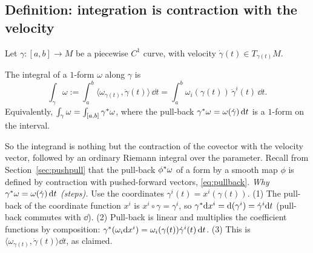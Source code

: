 \subsection{Definition: integration is contraction with the velocity}\label{sec:int1def}

Let $\gamma:[a,b]\to M$ be a piecewise $C^1$ curve, with velocity $\dot\gamma(t)\in T_{\gamma(t)}M$.

\begin{definition}
The integral of a $1$-form $\omega$ along $\gamma$ is
\begin{equation}\label{eq:lineint}
\int_\gamma\omega:=\int_a^b\bigl\langle\omega_{\gamma(t)},\dot\gamma(t)\bigr\rangle\,\dd t=\int_a^b\omega_i(\gamma(t))\,\dot\gamma^i(t)\,\dd t .
\end{equation}
Equivalently, $\int_\gamma\omega=\int_{[a,b]}\gamma{}^{*}\omega$, where the pull-back $\gamma{}^{*}\omega=\omega(\dot\gamma)\,\mathrm{d} t$ is a $1$-form on the interval.
\end{definition}

So the integrand is nothing but the contraction of the covector with the velocity vector, followed by an ordinary Riemann integral over the parameter.
Recall from Section~\ref{sec:pushpull} that the pull-back $\phi{}^{*}\omega$ of a form by a smooth map $\phi$ is defined by contraction with pushed-forward vectors, \eqref{eq:pullback}.
\emph{Why $\gamma{}^{*}\omega=\omega(\dot\gamma)\,\mathrm{d} t$ (steps).} Use the coordinates $\gamma^i(t)=x^i(\gamma(t))$. (1) The pull-back of the coordinate function $x^i$ is $x^i\circ\gamma=\gamma^i$, so $\gamma{}^{*}\mathrm{d} x^i=\mathrm{d}(\gamma^i)=\dot\gamma^i\mathrm{d} t$ (pull-back commutes with $\dd$).
(2) Pull-back is linear and multiplies the coefficient functions by composition: $\gamma{}^{*}(\omega_i\mathrm{d} x^i)=\omega_i(\gamma(t))\dot\gamma^i(t)\,\mathrm{d} t$. (3) This is $\langle\omega_{\gamma(t)},\dot\gamma(t)\rangle\dd t$, as claimed.

